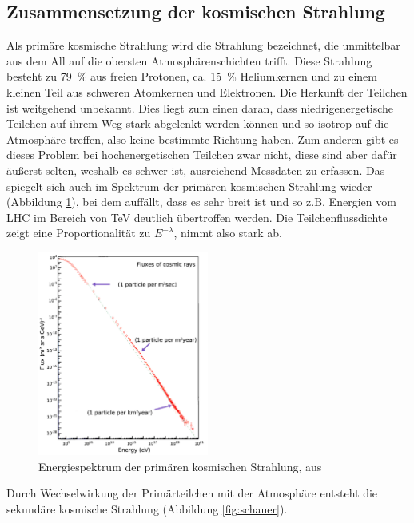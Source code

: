 \subsection{Zusammensetzung der kosmischen Strahlung} 
Als primäre kosmische Strahlung wird die Strahlung bezeichnet, die unmittelbar aus dem All auf die obersten Atmosphärenschichten trifft. Diese Strahlung besteht zu \SI{79}{\percent} aus freien Protonen, ca. \SI{15}{\percent} Heliumkernen und zu einem kleinen Teil aus schweren Atomkernen und Elektronen\cite{pdg}. Die Herkunft der Teilchen ist weitgehend unbekannt. Dies liegt zum einen daran, dass niedrigenergetische Teilchen auf ihrem Weg stark abgelenkt werden können und so isotrop auf die Atmosphäre treffen, also keine bestimmte Richtung haben. Zum anderen gibt es dieses Problem bei hochenergetischen Teilchen zwar nicht, diese sind aber dafür äußerst selten, weshalb es schwer ist, ausreichend Messdaten zu erfassen.  Das spiegelt sich auch im Spektrum der primären kosmischen Strahlung wieder (Abbildung \ref{fig:energiespektrum}), bei dem auffällt, dass es sehr breit ist und so z.B. Energien vom LHC im Bereich von \si{\tera\electronvolt} deutlich übertroffen werden. Die Teilchenflussdichte zeigt eine Proportionalität zu $E^{-\lambda}$, nimmt also stark ab.
\begin{figure}[h]
  \centering
  \includegraphics[width=0.5\textwidth]{data/energiespektrum.png}
  \caption{Energiespektrum der primären kosmischen Strahlung, aus \cite{Bietenholz:2013fta}}
  \label{fig:energiespektrum}
\end{figure}  

 Durch Wechselwirkung der Primärteilchen mit der Atmosphäre entsteht die sekundäre kosmische Strahlung (Abbildung \ref{fig:schauer}). 

